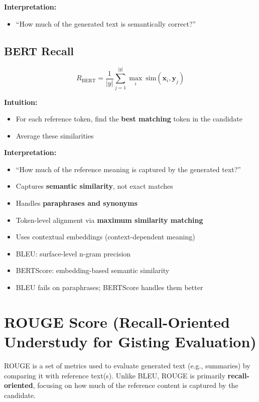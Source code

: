 \documentclass[10pt,a4paper]{article}
\begin{document}
\textbf{Interpretation:}
\begin{itemize}
    \item ``How much of the generated text is semantically correct?''
\end{itemize}

\subsection{BERT Recall}

\[
R_{\text{BERT}} =
\frac{1}{|y|} \sum_{j=1}^{|y|} \max_{i} \ \text{sim}(\mathbf{x}_i, \mathbf{y}_j)
\]

\textbf{Intuition:}
\begin{itemize}
    \item For each reference token, find the \textbf{best matching} token in the candidate
    \item Average these similarities
\end{itemize}

\textbf{Interpretation:}
\begin{itemize}
    \item ``How much of the reference meaning is captured by the generated text?''
\end{itemize}


\begin{itemize}
    \item Captures \textbf{semantic similarity}, not exact matches
    \item Handles \textbf{paraphrases and synonyms}
    \item Token-level alignment via \textbf{maximum similarity matching}
    \item Uses contextual embeddings (context-dependent meaning)
    \item BLEU: surface-level n-gram precision
    \item BERTScore: embedding-based semantic similarity
    \item BLEU fails on paraphrases; BERTScore handles them better
\end{itemize}

\section{ROUGE Score (Recall-Oriented Understudy for Gisting Evaluation)}

ROUGE is a set of metrics used to evaluate generated text (e.g., summaries) by comparing it with reference text(s). Unlike BLEU, ROUGE is primarily \textbf{recall-oriented}, focusing on how much of the reference content is captured by the candidate.
\end{document}

